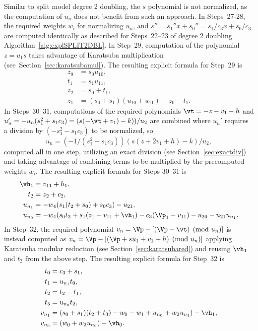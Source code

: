 Similar to split model degree 2 doubling, the $s$ polynomial is not normalized,
as the computation of $u_n$ does not benefit from such an approach. In Steps~27-28,
the required weights $w_i$ for normalizing $u_n$, and $s'' = s_1''x + s_0'' =
s_1/c_3x + s_0/c_3$ are computed identically as described for Steps~22--23 of
degree 2 doubling Algorithm~\ref{alg:explSPLIT2DBL}. In Step~29, computation of
the polynomial $z = u_1s$ takes advantage of Karatsuba multiplication
(see~Section~\ref{sec:karatsubamul}). The resulting explicit formula for Step~29
is
\begin{align*}
    z_0 &= s_0u_{10},\\
    t_1 &= s_1u_{11},\\
    z_2 &= s_0 + t_1,\\
    z_1 &= (s_0 + s_1)(u_{10} + u_{11}) - z_0 - t_1.
\end{align*}
In Steps~30--31, computations of the required polynomials $\vt = -z - v_1 - h$ and
$u_n' = -u_n(s_1^2 + s_1c_3) = (s(-\vt + v_1) - k))/u_2$ are combined where
$u_n'$ requires a division by $(-s_1^2 - s_1c_3)$ to be normalized, so 
$$ u_n = (-1/(s_1^2 + s_1c_3))(s(z + 2v_1 + h) - k)/u_2,$$ computed all in one step,
utilizing an exact division (see Section~\ref{sec:exactdiv}) and
taking advantage of combining terms to be multiplied by the
precomputed weights $w_i$. The resulting explicit formula for Steps 30--31 is 
\begin{align*}
    \vh_1   &= v_{11} + h_1,\\
    t_2     &= z_2 + c_2,\\
    u_{n_1} &= -w_4(s_1(t_2 + s_0) + s_0c_3) - u_{21},\\
    u_{n_0} &= -w_4(s_0t_2 + s_1(z_1 + v_{11} + \vh_1) - c_3(\Vp_1 - v_{11}) - u_{20} - u_{21}u_{n_1}.
\end{align*}
In Step~32, the  required polynomial $v_n = \Vp - [(\Vp - \vt) \pmod{u_n}]$ is
instead computed as $v_n = \Vp - [(\Vp + su_1 + v_1 + h) \pmod{u_n}]$ applying
Karatsuba modular reduction (see Section~\ref{sec:karatsubared}) and reusing
$\vh_1$ and $t_2$ from the above step. The resulting explicit formula for Step~32 is 
\begin{align*} 
    t_0 &= c_3 + s_1,\\
    t_1 &= u_{n_1}t_0,\\ 
    t_2 &= t_2 - t_1, \\
    t_3 &= u_{n_0}t_2,\\
    v_{n_1} &= (s_0 + s_1)(t_2 + t_3) - w_0 - w_1 + u_{n_0} + w_2u_{n_1}) - \vh_1,\\
    v_{n_0} &= (w_0 + w_2u_{n_0}) - \vh_0.
\end{align*}


